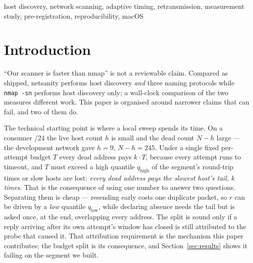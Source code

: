 \documentclass[conference]{IEEEtran}
\newcommand{\netsanity}{\textsf{netsanity}}
\newcommand{\nmapsn}{\texttt{nmap -sn}}
\newcommand{\qhigh}{q_{\mathrm{high}}}
\newcommand{\qlow}{q_{\mathrm{low}}}
\begin{document}
\begin{IEEEkeywords}
host discovery, network scanning, adaptive timing, retransmission, measurement
study, pre-registration, reproducibility, macOS
\end{IEEEkeywords}

\section{Introduction}

``Our scanner is faster than nmap'' is not a reviewable claim. Compared as
shipped, \netsanity{} performs host discovery \emph{and} three naming
protocols while \nmapsn{} performs host discovery only; a wall-clock comparison
of the two measures different work. This paper is organised around narrower
claims that can fail, and two of them do.

The technical starting point is where a local sweep spends its time. On a
consumer /24 the live host count $h$ is small and the dead count $N-h$ large
--- the development network gave $h=9$, $N-h=245$. Under a single fixed
per-attempt budget $T$ every dead address pays $k\!\cdot\!T$, because every
attempt runs to timeout, and $T$ must exceed a high quantile $\qhigh$ of the
segment's round-trip times or slow hosts are lost: \emph{every dead address
pays the slowest host's tail, $k$ times}. That is the consequence of using one
number to answer two questions. Separating them is cheap --- resending early
costs one duplicate packet, so $r$ can be driven by a \emph{low} quantile
$\qlow$, while declaring absence needs the tail but is asked once, at the end,
overlapping every address. The split is sound only if a reply arriving after
its own attempt's window has closed is still attributed to the probe that
caused it. That attribution requirement is the mechanism this paper
contributes; the budget split is its consequence, and
Section~\ref{sec:results} shows it failing on the segment we built.
\end{document}
